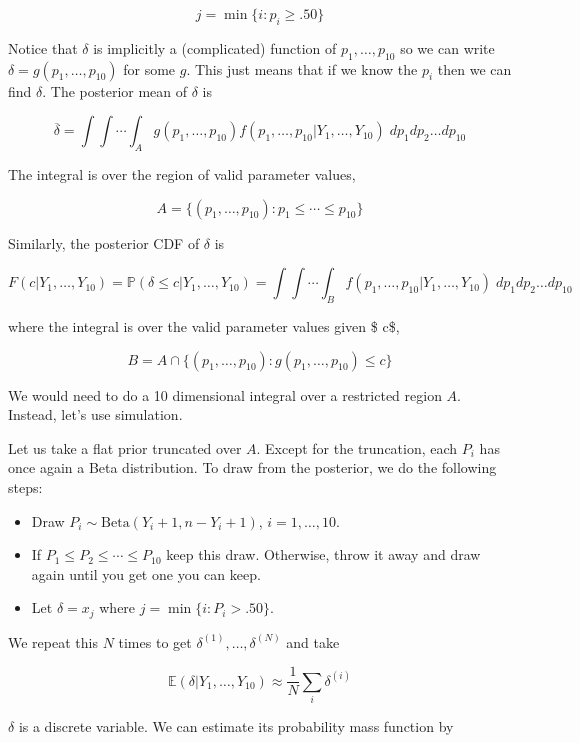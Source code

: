 \[ j = \min \{ i: p_i \geq .50 \} \]

Notice that \(\delta\) is implicitly a (complicated) function of
\(p_1, \dots, p_{10}\) so we can write
\(\delta = g(p_1, \dots, p_{10})\) for some \(g\). This just means that
if we know the \(p_i\) then we can find \(\delta\). The posterior mean
of \(\delta\) is

\[ \overline{\delta} = \int \int \cdots \int_A g(p_1, \dots, p_{10}) f(p_1, \dots, p_{10} | Y_1, \dots, Y_{10} ) \; dp_1 dp_2 \dots dp_{10} \]

The integral is over the region of valid parameter values,

\[ A = \{ (p_1, \dots, p_{10}) : p_1 \leq \cdots \leq p_{10} \} \]

Similarly, the posterior CDF of \(\delta\) is

\[
F(c | Y_1, \dots, Y_{10}) = \mathbb{P}(\delta \leq c | Y_1, \dots, Y_{10}) = \int \int \cdots \int_B f(p_1, \dots, p_{10} | Y_1, \dots, Y_{10} ) \; dp_1 dp_2 \dots dp_{10}
\]

where the integral is over the valid parameter values given \$
\delta \leq c\$,

\[ B = A \cap \{ (p_1, \dots, p_{10}) : g(p_1, \dots, p_{10}) \leq c \} \]

We would need to do a 10 dimensional integral over a restricted region
\(A\). Instead, let's use simulation.

Let us take a flat prior truncated over \(A\). Except for the
truncation, each \(P_i\) has once again a Beta distribution. To draw
from the posterior, we do the following steps:

\begin{itemize}[tightlist]
\item
  Draw \(P_i \sim \text{Beta}(Y_i + 1, n - Y_i + 1)\),
  \(i = 1, \dots, 10\).
\item
  If \(P_1 \leq P_2 \leq \cdots \leq P_{10}\) keep this draw. Otherwise,
  throw it away and draw again until you get one you can keep.
\item
  Let \(\delta = x_j\) where \(j = \min \{ i : P_i > .50 \}\).
\end{itemize}

We repeat this \(N\) times to get \(\delta^{(1)}, \dots, \delta^{(N)}\)
and take

\[ \mathbb{E}(\delta | Y_1, \dots, Y_{10}) \approx \frac{1}{N} \sum_i \delta^{(i)} \]

\(\delta\) is a discrete variable. We can estimate its probability mass
function by

